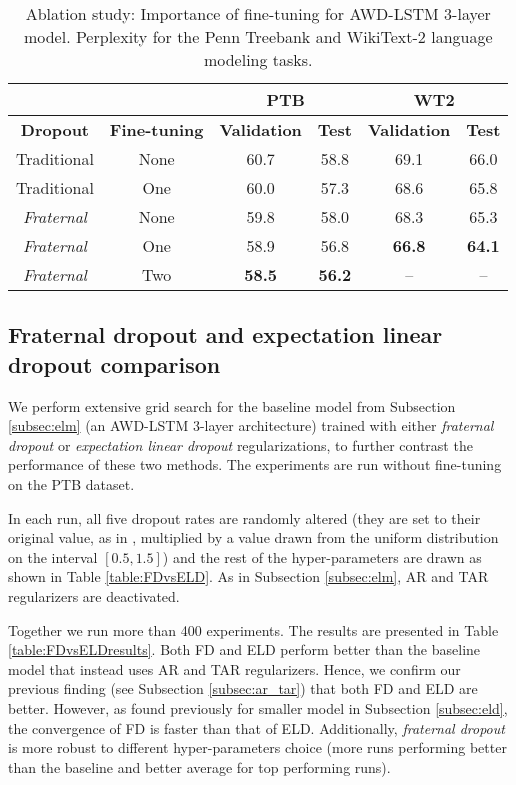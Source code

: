 \documentclass{article} %
\begin{document}
\begin{table}[t]
\vspace{-0.08cm}
\centering
\begin{tabular}{ c|c|c|c|c|c }
  \multicolumn{2}{c|}{}& \multicolumn{2}{c|}{\textbf{PTB}} & \multicolumn{2}{c}{\textbf{WT2}}\\
  \hline
  \textbf{Dropout} & \textbf{Fine-tuning} & \textbf{Validation} & \textbf{Test} & \textbf{Validation} & \textbf{Test}\\
  \hline
  Traditional & None & 60.7 & 58.8 & 69.1 & 66.0\\
  Traditional & One & 60.0 & 57.3 & 68.6 & 65.8\\
  \hline
  \emph{Fraternal} & None & 59.8 & 58.0 & 68.3 & 65.3\\
  \emph{Fraternal} & One & 58.9 & 56.8 & \textbf{66.8} & \textbf{64.1}\\
  \emph{Fraternal} & Two & \textbf{58.5} & \textbf{56.2} & -- & --\\
\end{tabular}
\caption{Ablation study: Importance of fine-tuning for AWD-LSTM 3-layer model. Perplexity for the Penn Treebank and WikiText-2 language modeling tasks.}
\label{table:finetuning}
\vspace{-0.08cm}
\end{table}

\subsection{Fraternal dropout and expectation linear dropout comparison}\label{FDvsELD}

We perform extensive grid search for the baseline model from Subsection \ref{subsec:elm} (an AWD-LSTM 3-layer architecture) trained with either \emph{fraternal dropout} or \emph{expectation linear dropout} regularizations, to further contrast the performance of these two methods. The experiments are run without fine-tuning on the PTB dataset.

In each run, all five dropout rates are randomly altered (they are set to their original value, as in \cite{merity2017regularizing}, multiplied by a value drawn from the uniform distribution on the interval $[0.5,1.5]$) and the rest of the hyper-parameters are drawn as shown in Table \ref{table:FDvsELD}. As in Subsection \ref{subsec:elm}, AR and TAR regularizers are deactivated.

Together we run more than 400 experiments. The results are presented in Table \ref{table:FDvsELDresults}. Both FD and ELD perform better than the baseline model that instead uses AR and TAR regularizers. Hence, we confirm our previous finding (see Subsection \ref{subsec:ar_tar}) that both FD and ELD are better. However, as found previously for smaller model in Subsection \ref{subsec:eld}, the convergence of FD is faster than that of ELD. Additionally, \emph{fraternal dropout} is more robust to different hyper-parameters choice (more runs performing better than the baseline and better average for top performing runs).
\end{document}
